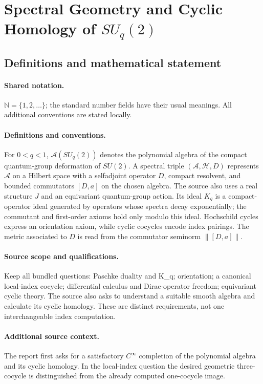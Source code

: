 \documentclass[11pt]{article}
\begin{document}
\section{Spectral Geometry and Cyclic Homology of $SU_q(2)$}\label{statement}

\subsection{Definitions and mathematical statement}

\paragraph{Shared notation.}$\mathbb N=\{1,2,\ldots\}$; the standard number fields have their usual meanings. All additional conventions are stated locally.


\paragraph{Definitions and conventions.} For $0<q<1$, $\mathcal A(SU_q(2))$ denotes the polynomial algebra of the compact quantum-group deformation of $SU(2)$. A spectral triple $(\mathcal A,\mathcal H,D)$ represents $\mathcal A$ on a Hilbert space with a selfadjoint operator $D$, compact resolvent, and bounded commutators $[D,a]$ on the chosen algebra. The source also uses a real structure $J$ and an equivariant quantum-group action. Its ideal $K_q$ is a compact-operator ideal generated by operators whose spectra decay exponentially; the commutant and first-order axioms hold only modulo this ideal. Hochschild cycles express an orientation axiom, while cyclic cocycles encode index pairings. The metric associated to $D$ is read from the commutator seminorm $\|[D,a]\|$.

\paragraph{Source scope and qualifications.} Keep all bundled questions: Paschke duality and K\_q; orientation; a canonical local-index cocycle; differential calculus and Dirac-operator freedom; equivariant cyclic theory. The source also asks to understand a suitable smooth algebra and calculate its cyclic homology. These are distinct requirements, not one interchangeable index computation.

\paragraph{Additional source context.} The report first asks for a satisfactory $C^\infty$ completion of the polynomial algebra and its cyclic homology. In the local-index question the desired geometric three-cocycle is distinguished from the already computed one-cocycle image.
\end{document}
